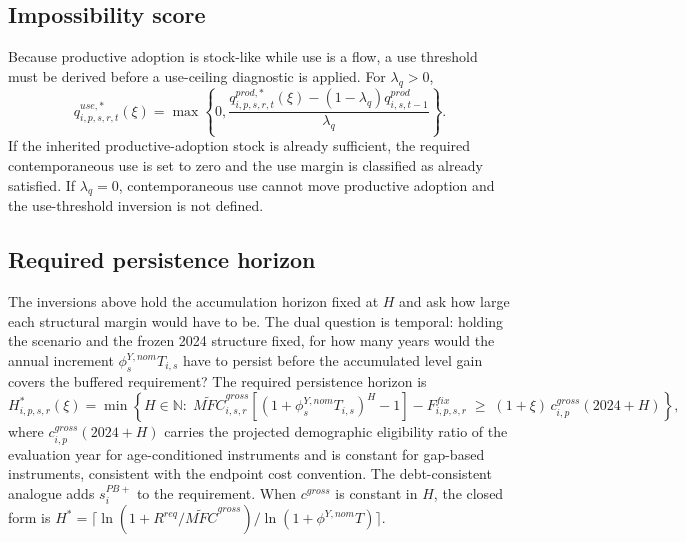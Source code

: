 \documentclass[11pt,a4paper]{article}
\begin{document}
\subsection{Impossibility score}\label{subsec:impossibility_score}

Because productive adoption is stock-like while use is a flow, a use threshold must be derived before a use-ceiling diagnostic is applied. For $\lambda_q>0$,
\begin{equation}\label{eq:q_use_star_v11}
    q^{use,*}_{i,p,s,r,t}(\xi)=\max\left\{0,
    \frac{q^{prod,*}_{i,p,s,r,t}(\xi)-(1-\lambda_q)q^{prod}_{i,s,t-1}}{\lambda_q}
    \right\}.
\end{equation}
If the inherited productive-adoption stock is already sufficient, the required contemporaneous use is set to zero and the use margin is classified as already satisfied. If $\lambda_q=0$, contemporaneous use cannot move productive adoption and the use-threshold inversion is not defined.

\subsection{Required persistence horizon}\label{subsec:h_star_inversion}

The inversions above hold the accumulation horizon fixed at $H$ and ask how large each
structural margin would have to be. The dual question is temporal: holding the scenario and
the frozen 2024 structure fixed, for how many years would the annual increment
$\phi^{Y,nom}_{s}T_{i,s}$ have to persist before the accumulated level gain covers the
buffered requirement? The required persistence horizon is
\begin{equation}\label{eq:h_star_inversion}
    H^{*}_{i,p,s,r}(\xi)=\min\left\{H\in\mathbb{N}:\;
    \widetilde{MFC}^{gross}_{i,s,r}\left[(1+\phi^{Y,nom}_{s}T_{i,s})^{H}-1\right]
    -F^{fix}_{i,p,s,r}\;\geq\;(1+\xi)\,c^{gross}_{i,p}(2024+H)\right\},
\end{equation}
where $c^{gross}_{i,p}(2024+H)$ carries the projected demographic eligibility ratio of the
evaluation year for age-conditioned instruments and is constant for gap-based instruments,
consistent with the endpoint cost convention. The debt-consistent analogue adds
$s^{PB+}_{i}$ to the requirement. When $c^{gross}$ is constant in $H$, the closed form is
$H^{*}=\lceil \ln(1+R^{req}/\widetilde{MFC}^{gross})/\ln(1+\phi^{Y,nom}T)\rceil$.
\end{document}
